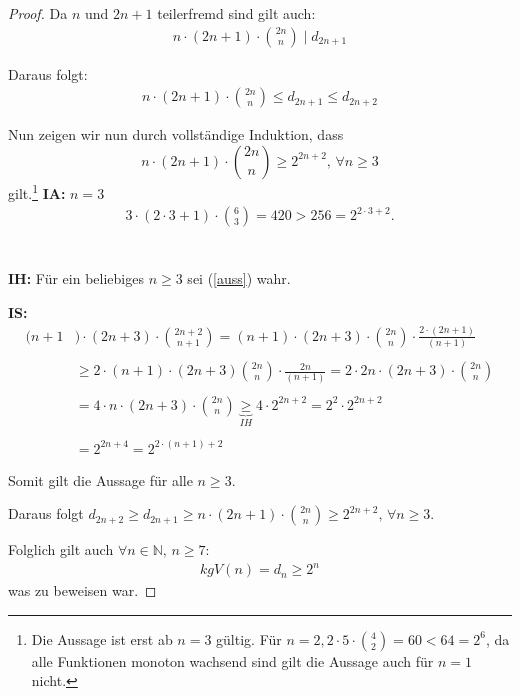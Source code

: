 \documentclass[12pt,oneside]{article}
\theoremstyle{remark}
\theoremstyle{definition}
\begin{document}
\begin{proof}
Da $n $ und $2n + 1$ teilerfremd sind gilt auch:
\begin{align*}
    n \cdot (2n + 1) \cdot {2n \choose n} \mid d_{2n + 1}
\end{align*}

Daraus folgt:
\begin{align*}
    n \cdot (2n + 1) \cdot {2n \choose n} \leq d_{2n + 1} \leq d_{2n + 2}
\end{align*}

Nun zeigen wir nun durch vollständige Induktion, dass 
\begin{equation}\label{auss}
    n \cdot (2n + 1) \cdot {2n \choose n} \geq 2^{2n + 2}, \, \forall n \geq 3
\end{equation}
gilt.\footnote{Die Aussage ist erst ab $n = 3$ gültig. Für $n = 2, 2 \cdot 5 \cdot {4 \choose 2} = 60 < 64 = 2^{6} $, da alle Funktionen monoton wachsend sind gilt die Aussage auch für $n = 1$ nicht.}\newline\newline
\textbf{IA:} $n = 3$
\begin{align*}
    3 \cdot (2 \cdot 3 + 1) \cdot { 6 \choose 3} = 420 > 256 = 2^{2 \cdot 3 + 2}.
\end{align*}
\\
\\
\textbf{IH:} Für ein beliebiges $n \geq 3$ sei (\ref{auss}) wahr.\newline\newline

\textbf{IS:}
\begin{align*}
    (n + 1&) \cdot (2n + 3) \cdot {2n + 2 \choose n + 1} =(n + 1) \cdot (2n + 3) \cdot {2n \choose n} \cdot \frac{2 \cdot (2n + 1)}{(n + 1)} \\
    \\
    &\geq 2 \cdot (n + 1) \cdot (2n + 3) {2n \choose n} \cdot \frac{2n}{(n + 1)} = 2 \cdot 2n \cdot (2n + 3) \cdot {2n \choose n} \\
    \\ 
    &= 4 \cdot n \cdot (2n + 3) \cdot {2n \choose n} \underbrace{\geq}_{IH} 4 \cdot 2^{2n + 2} = 2^2 \cdot 2^{2n + 2}\\
    \\
    &= 2^{2n + 4} = 2^{2 \cdot (n + 1) + 2} 
\end{align*}

Somit gilt die Aussage für alle $n \geq 3$.\newline\newline 

Daraus folgt $d_{2n + 2} \geq d_{2n + 1} \geq  n \cdot (2n + 1) \cdot {2n \choose n} \geq 2^{2n + 2}, \, \forall n \geq 3$.\newline\newline

Folglich gilt auch $\forall n \in \mathbb{N}, \, n \geq 7$:
\begin{align*}
    kgV(n)= d_{n} \geq 2^{n}
\end{align*}
was zu beweisen war.
\end{proof}
\end{document}
